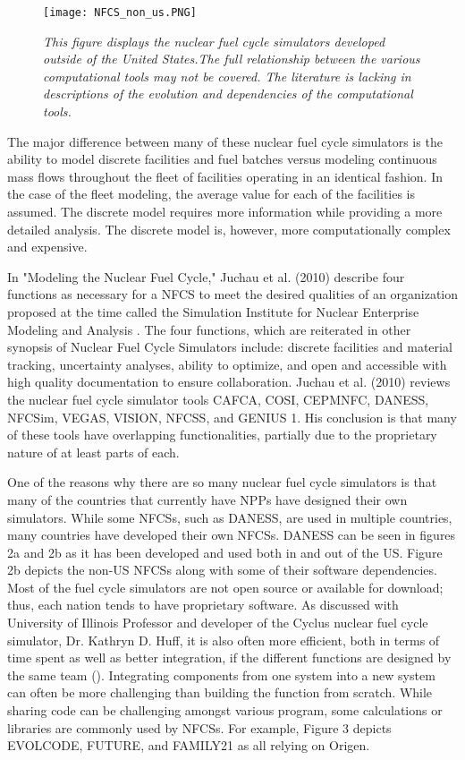 \documentclass{article}                                                                           %
\begin{document}
\begin{linenumbers}
\begin{subfigures}
\begin{figure*}
\texttt{[image: NFCS\_non\_us.PNG]}
\caption{\small \sl This figure displays the nuclear fuel cycle simulators developed outside of the United States.The full relationship between the various computational tools may not be covered.  The literature is lacking in descriptions of the evolution and dependencies of the computational tools.}
\end{figure*}
\end{subfigures}

The major difference between many of these nuclear fuel cycle simulators is the ability to model discrete facilities and fuel batches versus modeling continuous mass flows throughout the fleet of facilities operating in an identical fashion. In the case of the fleet modeling, the average value for each of the facilities is assumed. The discrete model requires more information while providing a more detailed analysis. The discrete model is, however, more computationally complex and expensive.

In "Modeling the Nuclear Fuel Cycle," Juchau et al. (2010) describe four functions as necessary for a NFCS to meet the desired qualities of an organization proposed at the time called the Simulation Institute for Nuclear Enterprise Modeling and Analysis \cite{Juchau2010}. The four functions, which are reiterated in other synopsis of Nuclear Fuel Cycle Simulators \cite{Wilson2012, NEA2012} include: discrete facilities and material tracking, uncertainty analyses, ability to optimize, and open and accessible with high quality documentation to ensure collaboration. Juchau et al. (2010) reviews the nuclear fuel cycle simulator tools CAFCA, COSI, CEPMNFC, DANESS, NFCSim, VEGAS, VISION, NFCSS, and GENIUS 1. His conclusion is that many of these tools have overlapping functionalities, partially due to the proprietary nature of at least parts of each.

One of the reasons why there are so many nuclear fuel cycle simulators is that many of the countries that currently have NPPs have designed their own simulators. While some NFCSs, such as DANESS, are used in multiple countries, many countries have developed their own NFCSs.  DANESS can be seen in figures 2a and 2b as it has been developed and used both in and out of the US. Figure 2b depicts the non-US NFCSs along with some of their software dependencies. Most of the fuel cycle simulators are not open source or available for download; thus, each nation tends to have proprietary software. As discussed with University of Illinois Professor and developer of the Cyclus nuclear fuel cycle simulator, Dr. Kathryn D. Huff, it is also often more efficient, both in terms of time spent as well as better integration, if the different functions are designed by the same team (\cite{redfoot_huff_2016}). Integrating components from one system into a new system can often be more challenging than building the function from scratch. While sharing code can be challenging amongst various program, some calculations or libraries are commonly used by NFCSs. For example, Figure 3 depicts EVOLCODE, FUTURE, and FAMILY21 as all relying on Origen.


\end{linenumbers}
\end{document}
